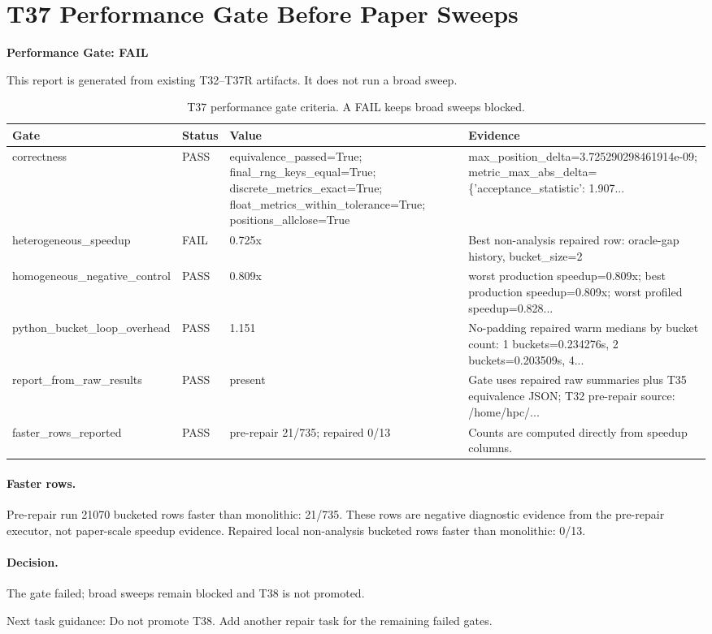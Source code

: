 \section*{T37 Performance Gate Before Paper Sweeps}
\textbf{Performance Gate: FAIL}

This report is generated from existing T32--T37R artifacts. It does not run a broad sweep.

\begin{table}[htbp]
\centering
\caption{T37 performance gate criteria. A FAIL keeps broad sweeps blocked.}
\begin{tabular}{llll}
\hline
Gate & Status & Value & Evidence \\
\hline
correctness & PASS & equivalence\_passed=True; final\_rng\_keys\_equal=True; discrete\_metrics\_exact=True; float\_metrics\_within\_tolerance=True; positions\_allclose=True & max\_position\_delta=3.725290298461914e-09; metric\_max\_abs\_delta=\{'acceptance\_statistic': 1.907... \\
heterogeneous\_speedup & FAIL & 0.725x & Best non-analysis repaired row: oracle-gap history, bucket\_size=2 \\
homogeneous\_negative\_control & PASS & 0.809x & worst production speedup=0.809x; best production speedup=0.809x; worst profiled speedup=0.828... \\
python\_bucket\_loop\_overhead & PASS & 1.151 & No-padding repaired warm medians by bucket count: 1 buckets=0.234276s, 2 buckets=0.203509s, 4... \\
report\_from\_raw\_results & PASS & present & Gate uses repaired raw summaries plus T35 equivalence JSON; T32 pre-repair source: /home/hpc/... \\
faster\_rows\_reported & PASS & pre-repair 21/735; repaired 0/13 & Counts are computed directly from speedup columns. \\
\hline
\end{tabular}
\end{table}

\paragraph{Faster rows.}
Pre-repair run 21070 bucketed rows faster than monolithic: 21/735. These rows are negative diagnostic evidence from the pre-repair executor, not paper-scale speedup evidence.
Repaired local non-analysis bucketed rows faster than monolithic: 0/13.

\paragraph{Decision.}
The gate failed; broad sweeps remain blocked and T38 is not promoted.

Next task guidance: Do not promote T38. Add another repair task for the remaining failed gates.
